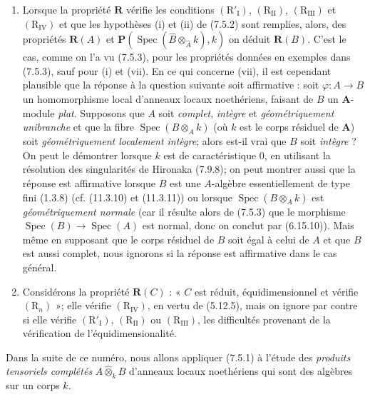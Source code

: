 \begin{remarks}[7.5.4]
\begin{enumerate}
\item[(iii)] Lorsque la propriété $\boldsymbol R$ vérifie les conditions
$(\mathrm R'_{\mathrm I})$, $(\mathrm R_{\mathrm{II}})$,
$(\mathrm R_{\mathrm{III}})$ et $(\mathrm R_{\mathrm{IV}})$ et que les
hypothèses (i) et (ii) de (7.5.2) sont remplies, alors, des propriétés
$\boldsymbol R(A)$ et
$\boldsymbol P(\operatorname{Spec}(\widehat B
\otimes_{\widehat A}k),k)$
on déduit $\boldsymbol R(B)$. C'est le cas, comme on l'a vu (7.5.3), pour les
propriétés données en exemples dans (7.5.3), sauf pour (i) et (vii). En ce qui
concerne (vii), il est cependant plausible que la réponse à la question
suivante soit affirmative : soit $\varphi:A\to B$ un homomorphisme local
d'anneaux locaux noethériens, faisant de $B$ un $\mathbf{A}$-module \emph{plat}. Supposons que
$A$ soit \emph{complet}, \emph{intègre} et \emph{géométriquement unibranche} et que la fibre
$\operatorname{Spec}(B\otimes_A k)$ (où $k$ est le corps résiduel de $\mathbf{A}$) soit
\emph{géométriquement localement intègre}; alors est-il vrai que $B$ soit \emph{intègre} ?
On peut le démontrer lorsque $k$ est de caractéristique 0, en utilisant la
résolution des singularités de Hironaka (7.9.8); on peut montrer aussi que la
réponse est affirmative lorsque $B$ est une $A$-algèbre essentiellement de
type fini (1.3.8) (cf. (11.3.10) et (11.3.11)) ou lorsque
$\operatorname{Spec}(B\otimes_A k)$ est \emph{géométriquement normale} (car il résulte
alors de (7.5.3) que le morphisme
$\operatorname{Spec}(B)\to\operatorname{Spec}(A)$ est normal, donc on conclut
par (6.15.10)). Mais même en supposant que le corps résiduel de $B$ soit égal
à celui de $A$ et que $B$ est aussi complet, nous ignorons si la réponse est
affirmative dans le cas général.

\item[(iv)] Considérons la propriété $\boldsymbol R(C)$ : « $C$ est
réduit, équidimensionnel et vérifie $(\mathrm R_n)$ »; elle vérifie
$(\mathrm R_{\mathrm{IV}})$, en vertu de (5.12.5), mais on ignore par contre si
elle vérifie $(\mathrm R'_{\mathrm I})$, $(\mathrm R_{\mathrm{II}})$ ou
$(\mathrm R_{\mathrm{III}})$, les difficultés provenant de la vérification de
l'équidimensionalité.
\end{enumerate}
\end{remarks}


Dans la suite de ce numéro, nous allons appliquer (7.5.1) à l'étude des
\emph{produits tensoriels complétés} $A\widehat\otimes_k B$ d'anneaux locaux
noethériens qui sont des algèbres sur un corps $k$.

